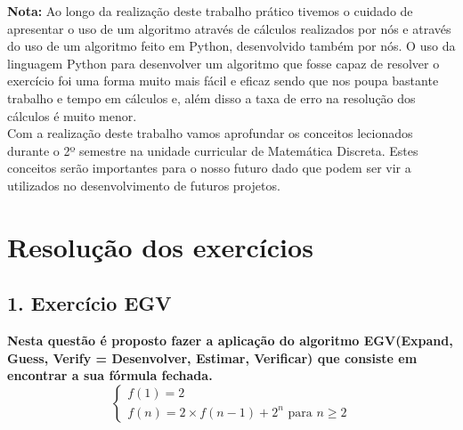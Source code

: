 \documentclass[12pt]{article}
\begin{document}
    \newpage
    \noindent\textbf{Nota:} Ao longo da realização deste trabalho prático tivemos o cuidado de apresentar o uso de um algoritmo através de cálculos realizados por nós e através do uso de um algoritmo feito em Python, desenvolvido também por nós. O uso da linguagem Python para desenvolver um algoritmo que fosse capaz de resolver o exercício foi uma forma muito mais fácil e eficaz sendo que nos poupa bastante trabalho e tempo em cálculos e, além disso a taxa de erro na resolução dos cálculos é muito menor.\\
    
     \noindent Com a realização deste trabalho vamos aprofundar os conceitos lecionados durante o 2º semestre na unidade curricular de Matemática Discreta. Estes conceitos serão importantes para o nosso futuro dado que podem ser vir a utilizados no desenvolvimento de futuros projetos.   
    
    \newpage
    
    \section{Resolução dos exercícios}
    
    \subsection{1. Exercício EGV}
   \noindent \textbf{Nesta questão é proposto fazer a aplicação do algoritmo EGV(Expand, Guess, Verify = Desenvolver, Estimar, Verificar) que consiste em encontrar a sua fórmula fechada.}\\

   
   
     \[
        \begin{cases} 
          f(1) = 2  \\ 
          f(n) = 2 \times f(n - 1) + 2^n \mbox{ para }  n\geqslant 2 
       \end{cases}
    \]
    \vspace{0.5cm}
    \\
   
\end{document}
